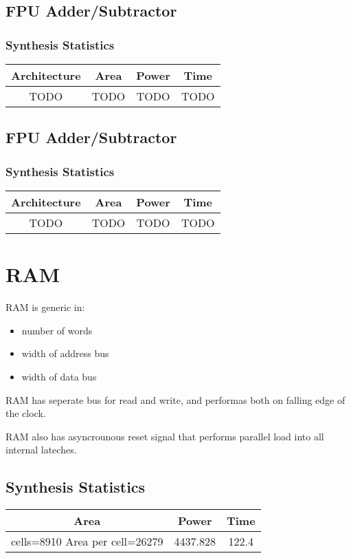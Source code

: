 \documentclass[12pt]{report}
\begin{document}
  \subsection{FPU Adder/Subtractor}
    \subsubsection{Synthesis Statistics}
    \begin{tabular}{||c|c|c|c||}
      \hline
      Architecture & Area & Power & Time\\\hline\hline
      TODO & TODO & TODO & TODO\\\hline
  \end{tabular}

  \subsection{FPU Adder/Subtractor}
    \subsubsection{Synthesis Statistics}
    \begin{tabular}{||c|c|c|c||}
      \hline
      Architecture & Area & Power & Time\\\hline\hline
      TODO & TODO & TODO & TODO\\\hline
  \end{tabular}

  \section{RAM}
  RAM is generic in:

  \begin{itemize}
    \item number of words
    \item width of address bus
    \item width of data bus
  \end{itemize}

  RAM has seperate bus for read and write, and performas both on falling edge of the clock. 

  RAM also has asyncrounous reset signal that performs parallel load into all internal lateches. 

  \subsection{Synthesis Statistics}
  \begin{tabular}{||c|c|c||}
      \hline
      Area & Power & Time\\\hline\hline
      cells=8910 Area per cell=26279 & 4437.828 & 122.4\\\hline
  \end{tabular}
\end{document}
